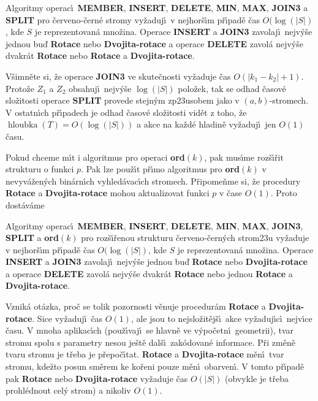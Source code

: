 \documentclass[a4paper,12pt]{article}
\DeclareMathOperator*{\hloubka}{hloubka}
\begin{document}
Algoritmy operac\'\i\ {\bf MEMBER}, {\bf INSERT}, 
{\bf DE\-LE\-TE}, {\bf MIN}, {\bf MAX}, {\bf JOIN3} a {\bf SPLIT} pro \v cerveno-\v cern\'e 
stro\-my vy\v zaduj\'\i\ v nejhor\v s\'\i m p\v r\'\i pad\v e \v cas $O
(\log(|S|)$, kde $S$ je 
reprezentovan\'a mno\v zina.  Operace {\bf INSERT} a {\bf JOIN3} zavolaj\'\i\ 
nejv\'y\v se jednou bu\v d {\bf Rotace} nebo {\bf Dvojita-rota\-ce} a operace 
{\bf DE\-LE\-TE} zavol\'a nejv\'y\v se dvakr\'at {\bf Rotace} nebo {\bf Rotace} a 
{\bf Dvojita-ro\-ta\-ce}.  
\endproclaim

\flushpar V\v simn\v ete si, \v ze operace {\bf JOIN3} ve skute\v cnosti 
vy\v zaduje \v cas $O(|k_1-k_2|+1)$. Proto\v ze $Z_1$ a $Z_2$ obsahuj\'\i\ nejv\'y\v se 
$\log(|S|)$ polo\v zek, tak se odhad \v casov\'e slo\v zitosti operace {\bf SPLIT }
prove\-de stejn\'ym zp\accent23usobem jako v $(a,b)$-stromech. 
V ostatn\'\i ch p\v r\'\i\-pa\-dech je odhad \v casov\'e slo\v zitosti vid\v et z toho, 
\v ze $\hloubka(T)=O(\log(|S|))$ a akce na ka\v zd\'e hladin\v e vy\v zaduj\'\i\ jen 
$O(1)$ \v casu.
\medskip

\flushpar Pokud chceme m\'\i t i algoritmus pro operaci {\bf ord$
(k)$}, pak 
mus\'\i me roz\v s\'\i\v rit strukturu o funkci $p$. Pak lze pou\v z\'\i t p\v r\'\i mo 
algoritmus pro {\bf ord$(k)$} v nevyv\'a\v zen\'ych bin\'arn\'\i ch vyhled\'avac\'\i ch 
stromech. P\v ripome\v nme si, \v ze procedury {\bf Rotace} a {\bf Dvojita-rotace }
mohou aktualizovat funkci $p$ v \v case $O(1)$. Proto dost\'av\'ame 

Algoritmy operac\'\i\ {\bf MEMBER}, 
{\bf INSERT}, {\bf DE\-LE\-TE}, {\bf MIN}, {\bf MAX}, {\bf JOIN3}, {\bf SPLIT} a {\bf ord$
(k)$} pro 
roz\-\v s\'\i\-\v re\-nou strukturu \v cerveno-\v cern\'ych strom\accent23u vy\v zaduje 
v nejhor\v s\'\i m p\v r\'\i pad\v e \v cas $O(\log(|S|)$, kde $S$ je reprezentovan\'a 
mno\v zina.  Operace {\bf INSERT} a {\bf JOIN3} zavolaj\'\i\ nejv\'y\v se jednou bu\v d 
{\bf Rotace} nebo {\bf Dvojita-rota\-ce} a operace {\bf DELETE} zavol\'a nejv\'y\v se 
dvakr\'at {\bf Rotace} nebo jednou {\bf Rotace} a {\bf Dvojita-rotace}.  \endproclaim


\flushpar Vznik\'a ot\'azka, pro\v c se tolik pozornosti v\v enuje 
procedur\'am {\bf Rotace} a {\bf Dvojita-rotace}. Sice vy\v zaduj\'\i\ \v cas 
$O(1)$, ale jsou to nej\-slo\v zit\v ej\v s\'\i\ akce vy\v zaduj\'\i c\'\i\ nejv\'\i ce \v casu. 
V mnoha aplikac\'\i ch (pou\-\v z\'\i vaj\'\i\ se hlavn\v e ve v\'ypo\v cetn\'\i\ geometrii), 
tvar stromu spolu s parametry nesou je\v st\v e 
dal\v s\'\i\ zak\'odovan\'e informace. P\v ri zm\v en\v e tvaru stromu je 
t\v reba je p\v repo\v c\'\i tat. {\bf Rotace} a {\bf Dvojita-rotace} m\v en\'\i\ tvar 
stromu, kde\v zto posun sm\v erem ke ko\v reni pouze m\v en\'\i\ 
obarven\'\i . V tomto p\v r\'\i pad\v e pak {\bf Rotace} nebo {\bf Dvo\-ji\-ta-rotace }
vy\v zaduje \v cas $O(|S|)$ (obvykle je t\v reba prohl\'ednout cel\'y 
strom) a nikoliv $O(1)$.
\medskip
\end{document}
